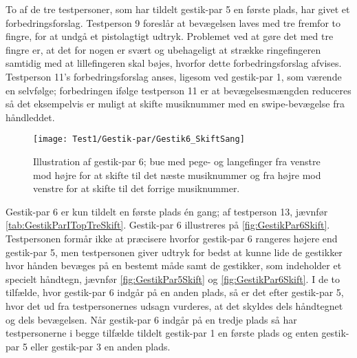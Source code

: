 To af de tre testpersoner, som har tildelt gestik-par 5 en første plads, har givet et forbedringsforslag. Testperson 9 foreslår at bevægelsen laves med tre fremfor to fingre, for at undgå et pistolagtigt udtryk. Problemet ved at gøre det med tre fingre er, at det for nogen er svært og ubehageligt at strække ringefingeren samtidig med at lillefingeren skal bøjes, hvorfor dette forbedringsforslag afvises. Testperson 11's forbedringsforslag anses, ligesom ved gestik-par 1, som værende en selvfølge; forbedringen ifølge testperson 11 er at bevægelsesmængden reduceres så det eksempelvis er muligt at skifte musiknummer med en swipe-bevægelse fra håndleddet.
%
\begin{figure}[H]
	\centering
	\texttt{[image: Test1/Gestik-par/Gestik6\_SkiftSang]}
	\caption{Illustration af gestik-par 6; bue med pege- og langefinger fra venstre mod højre for at skifte til det næste musiknummer og fra højre mod venstre for at skifte til det forrige musiknummer.}
	\label{fig:GestikPar6Skift}
\end{figure}
\noindent
%                
Gestik-par 6 er kun tildelt en første plads én gang; af testperson 13, jævnfør \autoref{tab:GestikParITopTreSkift}. Gestik-par 6 illustreres på \autoref{fig:GestikPar6Skift}. Testpersonen formår ikke at præcisere hvorfor gestik-par 6 rangeres højere end gestik-par 5, men testpersonen giver udtryk for bedst at kunne lide de gestikker hvor hånden bevæges på en bestemt måde samt de gestikker, som indeholder et specielt håndtegn, jævnfør \autoref{fig:GestikPar5Skift} og \autoref{fig:GestikPar6Skift}. I de to tilfælde, hvor gestik-par 6 indgår på en anden plads, så er det efter gestik-par 5, hvor det ud fra testpersonernes udsagn vurderes, at det skyldes dels håndtegnet og dels bevægelsen. Når gestik-par 6 indgår på en tredje plads så har testpersonerne i begge tilfælde tildelt gestik-par 1 en første plads og enten gestik-par 5 eller gestik-par 3 en anden plads. 

